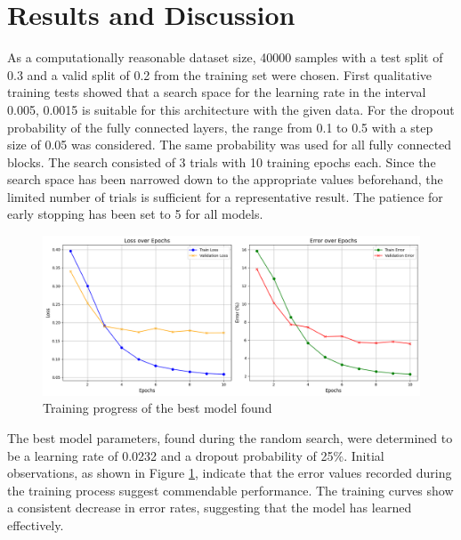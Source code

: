 \documentclass[a4paper, 11pt]{article}
\begin{document}
\section{Results and Discussion}
    As a computationally reasonable dataset size, 40000 samples with a test split of 0.3 and a valid split of 0.2 from the training set were chosen. First qualitative training tests showed that a search space for the learning rate in the interval 0.005, 0.0015 is suitable for this architecture with the given data. For the dropout probability of the fully connected layers, the range from 0.1 to 0.5 with a step size of 0.05 was considered. The same probability was used for all fully connected blocks. The search consisted of 3 trials with 10 training epochs each. Since the search space has been narrowed down to the appropriate values beforehand, the limited number of trials is sufficient for a representative result. The patience for early stopping has been set to 5 for all models. 
    \begin{figure}[h!]
        \includegraphics[width=\linewidth]{imgs/results_lr_0.00232.png}
        \caption{Training progress of the best model found}
        \label{fig:bestModel}
    \end{figure}
    The best model parameters, found during the random search, were determined to be a learning rate of 0.0232 and a dropout probability of 25\%. Initial observations, as shown in Figure \ref{fig:bestModel}, indicate that the error values recorded during the training process suggest commendable performance. The training curves show a consistent decrease in error rates, suggesting that the model has learned effectively.\\\\
\end{document}
